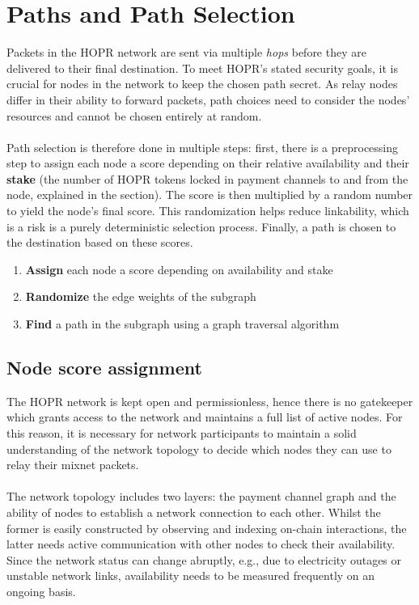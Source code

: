 \setlength{\parindent}{0pt}

\section{Paths and Path Selection}
\label{sec:path-selection}

Packets in the HOPR network are sent via multiple \textit{hops} before they are delivered to their final destination. To meet HOPR's stated security goals, it is crucial for nodes in the network to keep the chosen path secret. As relay nodes differ in their ability to forward packets, path choices need to consider the nodes' resources and cannot be chosen entirely at random.
\\~\\Path selection is therefore done in multiple steps: first, there is a preprocessing step to assign each node a score depending on their relative availability and their \textbf{stake} (the number of HOPR tokens locked in payment channels to and from the node, explained in the  section). The score is then multiplied by a random number to yield the node's final score. This randomization helps reduce linkability, which is a risk is a purely deterministic selection process. Finally, a path is chosen to the destination based on these scores.

\begin{enumerate}
    \item \textbf{Assign} each node a score depending on availability and stake
    \item \textbf{Randomize} the edge weights of the subgraph
    \item \textbf{Find} a path in the subgraph using a graph traversal algorithm
\end{enumerate}

\subsection{Node score assignment}
\label{sec:path-selection:node-score}

The HOPR network is kept open and permissionless, hence there is no gatekeeper which grants access to the network and maintains a full list of active nodes. For this reason, it is necessary for network participants to maintain a solid understanding of the network topology to decide which nodes they can use to relay their mixnet packets.
\\~\\The network topology includes two layers: the payment channel graph and the ability of nodes to establish a network connection to each other. Whilst the former is easily constructed by observing and indexing on-chain interactions, the latter needs active communication with other nodes to check their availability. Since the network status can change abruptly, e.g., due to electricity outages or unstable network links, availability needs to be measured frequently on an ongoing basis.

